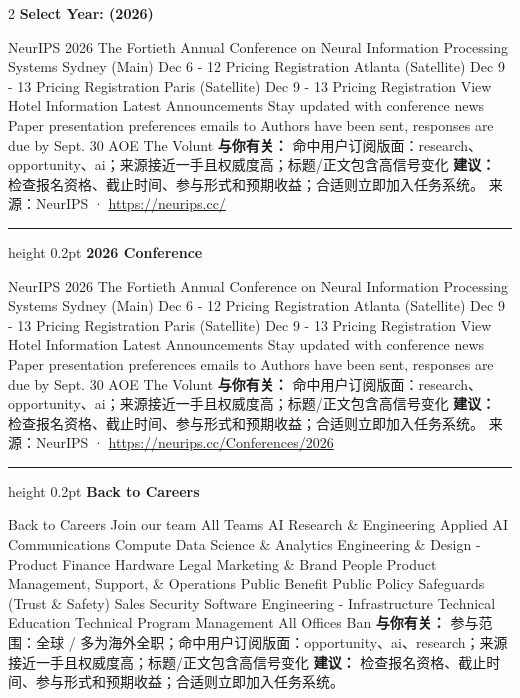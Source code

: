 \documentclass[10.5pt]{ctexart}
\begin{document}
\begin{multicols}{2}
{\large\bfseries Select Year: (2026)}\par
NeurIPS 2026 The Fortieth Annual Conference on Neural Information Processing Systems Sydney (Main) Dec 6 - 12 Pricing Registration Atlanta (Satellite) Dec 9 - 13 Pricing Registration Paris (Satellite) Dec 9 - 13 Pricing Registration View Hotel Information Latest Announcements Stay updated with conference news Paper presentation preferences emails to Authors have been sent, responses are due by Sept. 30 AOE The Volunt
\textbf{与你有关：} 命中用户订阅版面：research、opportunity、ai；来源接近一手且权威度高；标题/正文包含高信号变化
\textbf{建议：} 检查报名资格、截止时间、参与形式和预期收益；合适则立即加入任务系统。
{\footnotesize\color{ormuted} 来源：NeurIPS · \url{https://neurips.cc/}}
\vspace{2mm}
\hrule height 0.2pt
\vspace{2mm}
{\large\bfseries 2026 Conference}\par
NeurIPS 2026 The Fortieth Annual Conference on Neural Information Processing Systems Sydney (Main) Dec 6 - 12 Pricing Registration Atlanta (Satellite) Dec 9 - 13 Pricing Registration Paris (Satellite) Dec 9 - 13 Pricing Registration View Hotel Information Latest Announcements Stay updated with conference news Paper presentation preferences emails to Authors have been sent, responses are due by Sept. 30 AOE The Volunt
\textbf{与你有关：} 命中用户订阅版面：research、opportunity、ai；来源接近一手且权威度高；标题/正文包含高信号变化
\textbf{建议：} 检查报名资格、截止时间、参与形式和预期收益；合适则立即加入任务系统。
{\footnotesize\color{ormuted} 来源：NeurIPS · \url{https://neurips.cc/Conferences/2026}}
\vspace{2mm}
\hrule height 0.2pt
\vspace{2mm}
{\large\bfseries Back to Careers}\par
Back to Careers Join our team All Teams AI Research \& Engineering Applied AI Communications Compute Data Science \& Analytics Engineering \& Design - Product Finance Hardware Legal Marketing \& Brand People Product Management, Support, \& Operations Public Benefit Public Policy Safeguards (Trust \& Safety) Sales Security Software Engineering - Infrastructure Technical Education Technical Program Management All Offices Ban
\textbf{与你有关：} 参与范围：全球 / 多为海外全职；命中用户订阅版面：opportunity、ai、research；来源接近一手且权威度高；标题/正文包含高信号变化
\textbf{建议：} 检查报名资格、截止时间、参与形式和预期收益；合适则立即加入任务系统。

\end{multicols}
\end{document}

